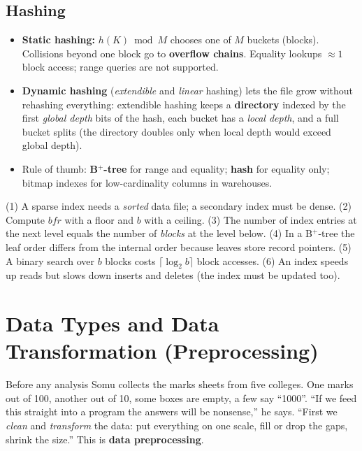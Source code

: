 \documentclass[11pt,a4paper]{article}
\begin{document}
\subsection{Hashing}
\begin{itemize}[noitemsep]
\item \textbf{Static hashing:} $h(K)\bmod M$ chooses one of $M$ buckets (blocks). Collisions beyond one block go to \textbf{overflow chains}. Equality lookups $\approx1$ block access; range queries are not supported.
\item \textbf{Dynamic hashing} (\emph{extendible} and \emph{linear} hashing) lets the file grow without rehashing everything: extendible hashing keeps a \textbf{directory} indexed by the first \emph{global depth} bits of the hash, each bucket has a \emph{local depth}, and a full bucket splits (the directory doubles only when local depth would exceed global depth).
\item Rule of thumb: \textbf{B$^+$-tree} for range and equality; \textbf{hash} for equality only; bitmap indexes for low-cardinality columns in warehouses.
\end{itemize}
\begin{trap}
(1) A sparse index needs a \emph{sorted} data file; a secondary index must be dense. (2) Compute $bfr$ with a floor and $b$ with a ceiling. (3) The number of index entries at the next level equals the number of \emph{blocks} at the level below. (4) In a B$^+$-tree the leaf order differs from the internal order because leaves store record pointers. (5) A binary search over $b$ blocks costs $\lceil\log_2b\rceil$ block accesses. (6) An index speeds up reads but slows down inserts and deletes (the index must be updated too).
\end{trap}
\section{Data Types and Data Transformation (Preprocessing)}

\begin{story}
Before any analysis Somu collects the marks sheets from five colleges. One marks out of 100, another out of 10, some boxes are empty, a few say ``1000''. ``If we feed this straight into a program the answers will be nonsense,'' he says. ``First we \emph{clean} and \emph{transform} the data: put everything on one scale, fill or drop the gaps, shrink the size.'' This is \textbf{data preprocessing}.
\end{story}
\end{document}
